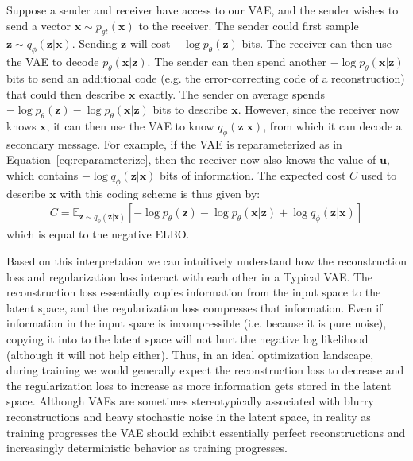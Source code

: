 \documentclass{article}
\begin{document}
Suppose a sender and receiver have access to our VAE, and the sender wishes to send a vector $\mathbf{x} \sim p_{gt}(\mathbf{x})$ to the receiver. The sender could first sample $\mathbf{z}\sim q_\phi(\mathbf{z}|\mathbf{x})$. Sending $\mathbf{z}$ will cost $-\log p_\theta(\mathbf{z})$ bits. The receiver can then use the VAE to decode $p_\theta(\mathbf{x}|\mathbf{z})$. The sender can then spend another $-\log p_\theta(\mathbf{x}|\mathbf{z})$ bits to send an additional code (e.g. the error-correcting code of a reconstruction) that could then describe $\mathbf{x}$ exactly. The sender on average spends $-\log p_\theta(\mathbf{z}) -  \log p_\theta(\mathbf{x}|\mathbf{z})$ bits to describe $\mathbf{x}$.
However, since the receiver now knows $\mathbf{x}$, it can then use the VAE to know $q_\phi(\mathbf{z}|\mathbf{x})$, from which it can decode a secondary message. For example, if the VAE is reparameterized as in Equation~\ref{eq:reparameterize}, then the receiver now also knows the value of $\mathbf{u}$, which contains $-\log q_\phi(\mathbf{z}|\mathbf{x})$ bits of information.
The expected cost $C$ used to describe $\mathbf{x}$ with this coding scheme is thus given by:
\begin{align}
    C = \mathbb{E}_{\mathbf{z}\sim q_\phi(\mathbf{z}|\mathbf{x})}[-\log p_\theta(\mathbf{z}) -  \log p_\theta(\mathbf{x}|\mathbf{z}) +  \log q_\phi(\mathbf{z}|\mathbf{x})]
\end{align}
which is equal to the negative ELBO.

Based on this interpretation we can intuitively understand how the reconstruction loss and regularization loss interact with each other in a Typical VAE. The reconstruction loss essentially copies information from the input space to the latent space, and the regularization loss compresses that information.
Even if information in the input space is incompressible (i.e. because it is pure noise), copying it into to the latent space will not hurt the negative log likelihood (although it will not help either).
Thus, in an ideal  optimization landscape, during training we would generally expect the reconstruction loss to decrease and the regularization loss to increase as more information gets stored in the latent space. Although VAEs are sometimes stereotypically associated with blurry reconstructions and heavy stochastic noise in the latent space, in reality as training progresses the VAE should exhibit essentially perfect reconstructions and increasingly deterministic behavior as training progresses.
\end{document}
